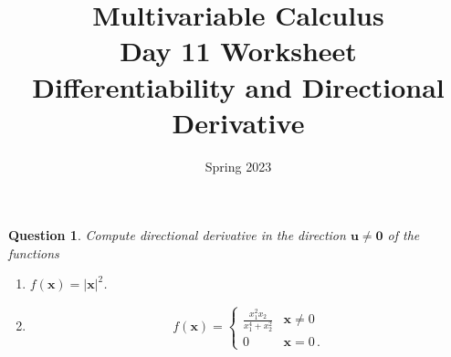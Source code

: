 \documentclass{amsart}
\title{ Multivariable Calculus \\ Day 11 Worksheet \\ Differentiability and  Directional Derivative }
\date{Spring 2023}
\newtheorem{question}{Question}
\theoremstyle{definition}
\newcommand{\vect}{\mathbf}
\begin{document}
\maketitle
\begin{question}
Compute directional derivative in the direction $\vect{u} \not= \vect{0}$ of the functions
\begin{enumerate}
    \item $f(\vect{x}) = |\vect{x}|^2$.
    \item $$ f(\vect{x}) = 
        \begin{cases}
            \frac{x_1^2 x_2}{x_1^4 + x_2^2} & \vect{x} \not= 0 \\
            0 & \vect{x} = 0 \,.
        \end{cases}$$
\end{enumerate}
\end{question}
\end{document}

